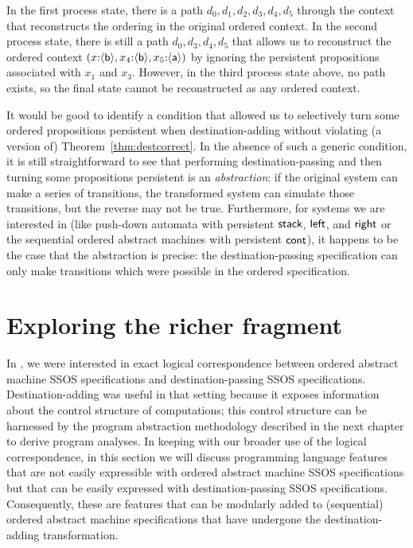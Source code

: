 In the
first process state, there is a path $d_0, d_1, d_2, d_3, d_4, d_5$ through
the context that reconstructs the ordering in the original ordered context.
In the second process state, there is still a path $d_0, d_3, d_4, d_5$ that
allows us to reconstruct the ordered context
$(x{:}\langle {\sf b} \rangle,
  x_4{:}\langle {\sf b} \rangle, x_5{:}\langle {\sf a} \rangle)$ by ignoring the persistent
propositions associated with $x_1$ and $x_3$. 
However, in the third process state above, no path exists, so the final
state cannot be reconstructed as any ordered context. 

It would be good to identify a condition that allowed us to
selectively turn some ordered propositions persistent when
destination-adding without violating (a version of)
Theorem~\ref{thm:destcorrect}. In the absence of such a generic
condition, it is still straightforward to see that performing
destination-passing and then turning some propositions persistent is
an {\it abstraction}: if the original system can make a series of
transitions, the transformed system can simulate those transitions,
but the reverse may not be true. Furthermore, for systems we are
interested in (like push-down automata with persistent ${\sf stack}$,
${\sf left}$, and ${\sf right}$ or the sequential ordered abstract
machines with persistent ${\sf cont}$), it happens to be the case that
the abstraction is precise: the destination-passing specification can
only make transitions which were possible in the ordered
specification.

\section{Exploring the richer fragment}

In \cite{simmons11logical}, we were interested in exact logical
correspondence between ordered abstract machine SSOS specifications
and destination-passing SSOS specifications. Destination-adding was
useful in that setting because it exposes information about the
control structure of computations; this control structure can be
harnessed by the program abstraction methodology described in the next
chapter to derive program analyses. In keeping with our broader use of
the logical correspondence, in this section we will discuss
programming language features that are not easily expressible with
ordered abstract machine SSOS specifications but that can be easily
expressed with destination-passing SSOS specifications. Consequently,
these are features that can be modularly added to (sequential) ordered
abstract machine specifications that have undergone the
destination-adding transformation.

